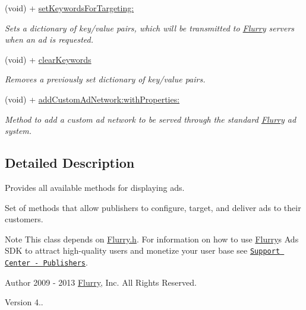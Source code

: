 \begin{DoxyCompactItemize}
(void) + \hyperlink{interfaceFlurryAds_ab20cb7f809e23a2a3a4984f6759144bc}{set\+Keywords\+For\+Targeting\+:}
\begin{DoxyCompactList}\small\item\em Sets a dictionary of key/value pairs, which will be transmitted to \hyperlink{interfaceFlurry}{Flurry} servers when an ad is requested. \end{DoxyCompactList}\item 
(void) + \hyperlink{interfaceFlurryAds_a4126bd3f3c8d8b48e77f5b6eb2788e78}{clear\+Keywords}
\begin{DoxyCompactList}\small\item\em Removes a previously set dictionary of key/value pairs. \end{DoxyCompactList}\item 
(void) + \hyperlink{interfaceFlurryAds_a5990d1a5ce87ebc8b0ecf246cfcb6a4e}{add\+Custom\+Ad\+Network\+:with\+Properties\+:}
\begin{DoxyCompactList}\small\item\em Method to add a custom ad network to be served through the standard \hyperlink{interfaceFlurry}{Flurry} ad system. \end{DoxyCompactList}\end{DoxyCompactItemize}


\subsection{Detailed Description}
Provides all available methods for displaying ads. 

Set of methods that allow publishers to configure, target, and deliver ads to their customers.

\begin{DoxyNote}{Note}
This class depends on \hyperlink{Flurry_8h_source}{Flurry.\+h}. For information on how to use \hyperlink{interfaceFlurry}{Flurry}\textquotesingle{}s Ads S\+DK to attract high-\/quality users and monetize your user base see \href{http://support.flurry.com/index.php?title=Publishers}{\tt Support Center -\/ Publishers}.
\end{DoxyNote}
\begin{DoxyAuthor}{Author}
2009 -\/ 2013 \hyperlink{interfaceFlurry}{Flurry}, Inc. All Rights Reserved. 
\end{DoxyAuthor}
\begin{DoxyVersion}{Version}
4.. 
\end{DoxyVersion}


